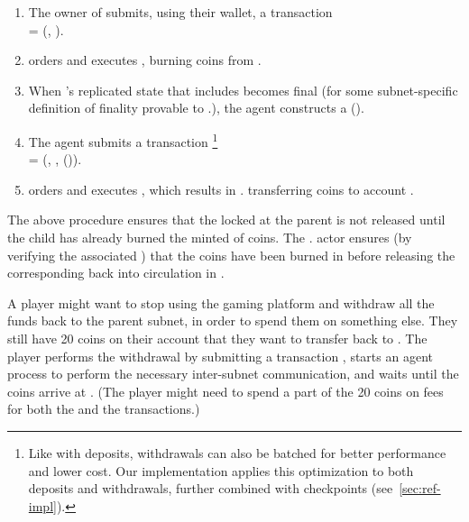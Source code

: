 \begin{enumerate}

    \item The owner of  submits, using their wallet, a transaction\\
     = (, ).
    
    \item {} orders and executes , burning  coins from .%
    
    \item When 's replicated state that includes  becomes final (for some subnet-specific definition of finality provable to .),
    the \ipc agent constructs a {\pof}().
    
    \item The \ipc agent submits a transaction%
    \footnote{Like with deposits, withdrawals can also be batched for better performance and lower cost. Our implementation applies this optimization to both deposits and withdrawals, further combined with checkpoints (see~\cref{sec:ref-impl}).}\\
     = (, , {\pof}()).
    
    \item {} orders and executes , which results in . transferring  coins to account .
    
\end{enumerate}

The above procedure ensures that the locked  at the parent is not released until the child has already burned the minted  of coins.
The . actor ensures (by verifying the associated \pof) that the coins have been burned in 
before releasing the corresponding  back into circulation in .

\begin{example}
\label{ex:withdrawal}
A player might want to stop using the gaming platform and withdraw all the funds back to the parent subnet, in order to spend them on something else.
They still have 20 coins on their account  that they want to transfer back to .
The player performs the withdrawal by submitting a transaction ,
starts an \ipc agent process to perform the necessary inter-subnet communication, and waits until the coins arrive at .
(The player might need to spend a part of the 20 coins on fees for both the  and the  transactions.)
\end{example}

